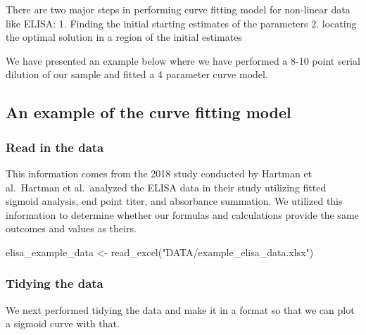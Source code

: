 \documentclass[
]{book}
\newenvironment{Shaded}{\begin{snugshade}}{\end{snugshade}}
\newcommand{\FunctionTok}[1]{\textcolor[rgb]{0.00,0.00,0.00}{#1}}
\newcommand{\NormalTok}[1]{#1}
\newcommand{\OtherTok}[1]{\textcolor[rgb]{0.56,0.35,0.01}{#1}}
\newcommand{\StringTok}[1]{\textcolor[rgb]{0.31,0.60,0.02}{#1}}
\begin{document}
There are two major steps in performing curve fitting model for non-linear data like ELISA:
1. Finding the initial starting estimates of the parameters
2. locating the optimal solution in a region of the initial estimates

We have presented an example below where we have performed a 8-10 point serial dilution of our sample and fitted a 4 parameter curve model.

\hypertarget{an-example-of-the-curve-fitting-model}{%
\subsection{An example of the curve fitting model}\label{an-example-of-the-curve-fitting-model}}

\hypertarget{read-in-the-data}{%
\subsubsection{Read in the data}\label{read-in-the-data}}

This information comes from the 2018 study conducted by Hartman et al.~Hartman et al.~analyzed the ELISA data in their study utilizing fitted sigmoid analysis, end point titer, and absorbance summation. We utilized this information to determine whether our formulas and calculations provide the same outcomes and values as theirs.

\begin{Shaded}
\begin{Highlighting}[]
\NormalTok{elisa\_example\_data }\OtherTok{\textless{}{-}} \FunctionTok{read\_excel}\NormalTok{(}\StringTok{"DATA/example\_elisa\_data.xlsx"}\NormalTok{)}
\end{Highlighting}
\end{Shaded}

\hypertarget{tidying-the-data}{%
\subsubsection{Tidying the data}\label{tidying-the-data}}

We next performed tidying the data and make it in a format so that we can plot a sigmoid curve with that.
\end{document}

